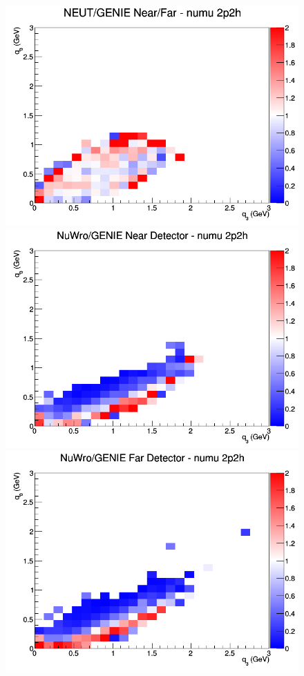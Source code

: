 \begin{figure}[h]
\endminipage
{}
\includegraphics[width=\linewidth]{eff_q0_q3/FGT/ratios/2p2h_NEUT_GENIE_numu_NF_q3_q0.png}
\endminipage
\newline
{}
\includegraphics[width=\linewidth]{eff_q0_q3/FGT/ratios/2p2h_NuWro_GENIE_numu_near_q3_q0.png}
\endminipage
{}
\includegraphics[width=\linewidth]{eff_q0_q3/FGT/ratios/2p2h_NuWro_GENIE_numu_far_q3_q0.png}

\end{figure}
